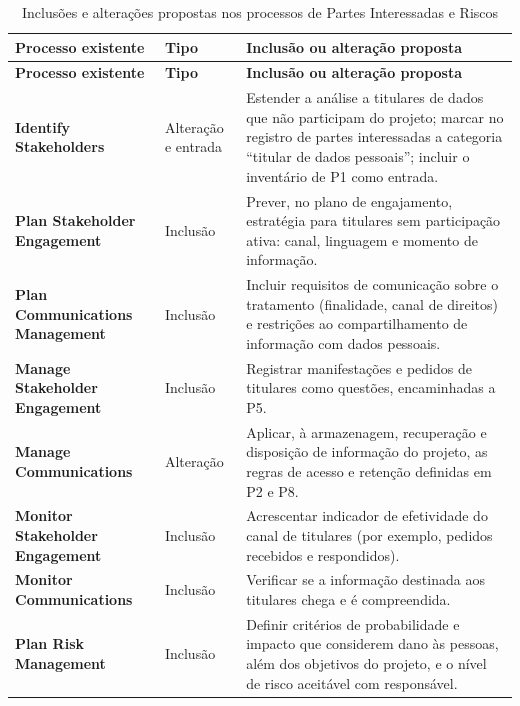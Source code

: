 \documentclass[11pt,a4paper]{article}
\newcommand{\SingleSpacing}{}
\begin{document}
\begingroup\SingleSpacing\small
\begin{longtable}{@{}>{\raggedright\arraybackslash}p{}>{\raggedright\arraybackslash}p{}>{\raggedright\arraybackslash}p{}@{}}
\caption{Inclusões e alterações propostas nos processos de Partes Interessadas e Riscos}\label{tab:t10}\\
\toprule
\textbf{Processo existente} & \textbf{Tipo} & \textbf{Inclusão ou alteração proposta}\\
\midrule
\endfirsthead
\toprule
\textbf{Processo existente} & \textbf{Tipo} & \textbf{Inclusão ou alteração proposta}\\
\midrule
\endhead
\bottomrule
\endfoot
\bottomrule
\endlastfoot
\textbf{Identify Stakeholders} & Alteração e entrada & Estender a análise a titulares de dados que não participam do projeto; marcar no registro de partes interessadas a categoria \textquotedblleft{}titular de dados pessoais\textquotedblright{}; incluir o inventário de P1 como entrada.\\[3pt]
\textbf{Plan Stakeholder Engagement} & Inclusão & Prever, no plano de engajamento, estratégia para titulares sem participação ativa: canal, linguagem e momento de informação.\\[3pt]
\textbf{Plan Communications Management} & Inclusão & Incluir requisitos de comunicação sobre o tratamento (finalidade, canal de direitos) e restrições ao compartilhamento de informação com dados pessoais.\\[3pt]
\textbf{Manage Stakeholder Engagement} & Inclusão & Registrar manifestações e pedidos de titulares como questões, encaminhadas a P5.\\[3pt]
\textbf{Manage Communications} & Alteração & Aplicar, à armazenagem, recuperação e disposição de informação do projeto, as regras de acesso e retenção definidas em P2 e P8.\\[3pt]
\textbf{Monitor Stakeholder Engagement} & Inclusão & Acrescentar indicador de efetividade do canal de titulares (por exemplo, pedidos recebidos e respondidos).\\[3pt]
\textbf{Monitor Communications} & Inclusão & Verificar se a informação destinada aos titulares chega e é compreendida.\\[3pt]
\textbf{Plan Risk Management} & Inclusão & Definir critérios de probabilidade e impacto que considerem dano às pessoas, além dos objetivos do projeto, e o nível de risco aceitável com responsável.\\[3pt]

\end{longtable}
\end{document}
